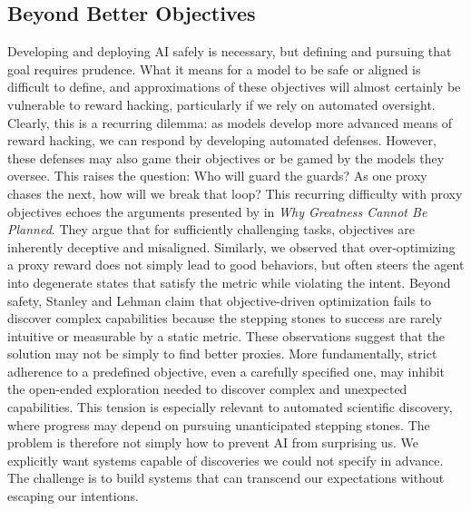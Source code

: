 \documentclass[10pt]{article}
\def\citet#1{}%
\begin{document}
\subsection{Beyond Better Objectives}
Developing and deploying AI safely is necessary, but defining and pursuing that goal requires prudence.
What it means for a model to be safe or aligned is difficult to define, and approximations of these objectives will almost certainly be vulnerable to reward hacking, particularly if we rely on automated oversight.
Clearly, this is a recurring dilemma: as models develop more advanced means of reward hacking, we can respond by developing automated defenses. 
However, these defenses may also game their objectives or be gamed by the models they oversee. 
This raises the question: Who will guard the guards?
As one proxy chases the next, how will we break that loop?
This recurring difficulty with proxy objectives echoes the arguments presented by \citet{stanley2015greatness} in \textit{Why Greatness Cannot Be Planned}.
They argue that for sufficiently challenging tasks, objectives are inherently deceptive and misaligned.
Similarly, we observed that over-optimizing a proxy reward does not simply lead to good behaviors, but often steers the agent into degenerate states that satisfy the metric while violating the intent. 
Beyond safety, Stanley and Lehman claim that objective-driven optimization fails to discover complex capabilities because the stepping stones to success are rarely intuitive or measurable by a static metric.
These observations suggest that the solution may not be simply to find better proxies. 
More fundamentally, strict adherence to a predefined objective, even a carefully specified one, may inhibit the open-ended exploration needed to discover complex and unexpected capabilities. 
This tension is especially relevant to automated scientific discovery, where progress may depend on pursuing unanticipated stepping stones. 
The problem is therefore not simply how to prevent AI from surprising us. We explicitly want systems capable of discoveries we could not specify in advance. The challenge is to build systems that can transcend our expectations without escaping our intentions.
\end{document}
